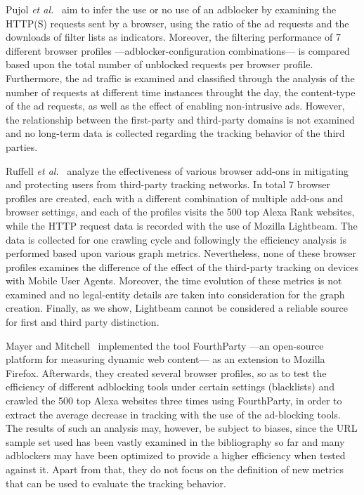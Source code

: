 \documentclass[compsoc, conference, letterpaper, 10pt, times]{IEEEtran}
\begin{document}
Pujol \textit{et al.}~\cite{pujol} aim to infer the use or no use of an adblocker by examining the HTTP(S) requests sent by a browser, using the ratio of the ad requests and the downloads of filter lists as indicators. Moreover, the filtering performance of 7 different browser profiles ---adblocker-configuration combinations--- is compared based upon the total number of unblocked requests per browser profile. Furthermore, the ad traffic is examined and classified through the analysis of the number of requests at different time instances throught the day, the content-type of the ad requests, as well as the effect of enabling non-intrusive ads. However, the relationship between the first-party and third-party domains is not examined and no long-term data is collected regarding the tracking behavior of the third parties.

Ruffell \textit{et al.}~\cite{ruffel2015} analyze the effectiveness of various browser add-ons in mitigating and protecting users from third-party tracking networks. In total 7 browser profiles are created, each with a different combination of multiple add-ons and browser settings, and each of the profiles visits the 500 top Alexa Rank websites, while the HTTP request data is recorded with the use of Mozilla Lightbeam. The data is collected for one crawling cycle and followingly the efficiency analysis is performed based upon various graph metrics. Nevertheless, none of these browser profiles examines the difference of the effect of the third-party tracking on devices with Mobile User Agents. Moreover, the time evolution of these metrics is not examined and no legal-entity details are taken into consideration for the graph creation. Finally, as we show, Lightbeam cannot be considered a reliable source for first and third party distinction.

Mayer and Mitchell~\cite{mayer} implemented the tool FourthParty ---an open-source platform for measuring dynamic web content--- as an extension to Mozilla Firefox. Afterwards, they created several browser profiles, so as to test the efficiency of different adblocking tools under certain settings (blacklists) and crawled the 500 top Alexa websites three times using FourthParty, in order to extract the average decrease in tracking with the use of the ad-blocking tools. The results of such an analysis may, however, be subject to biases, since the URL sample set used has been vastly examined in the bibliography so far and many adblockers may have been optimized to provide a higher efficiency when tested against it. Apart from that, they do not focus on the definition of new metrics that can be used to evaluate the tracking behavior.
\end{document}

